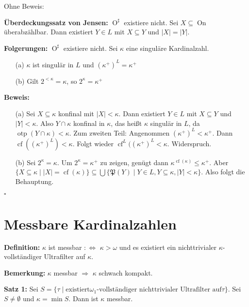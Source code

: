 \documentclass[a4paper,fontsize=11pt]{scrartcl}
\newcommand{\osharp}{\operatorname{O}^\sharp}
\newcommand{\On}{\operatorname{On}}
\newcommand{\cf}{\operatorname{cf}}
\newcommand{\otp}{\operatorname{otp}}
\begin{document}


Ohne Beweis:

{\bf Überdeckungssatz von Jensen:} $\osharp$ existiere
nicht. Sei $X\subseteq\On$ überabzählbar. Dann existiert $Y\in L$ mit
$X\subseteq Y$ und $|X|=|Y|$.

{\bf Folgerungen:} $\osharp$ existiere nicht. Sei $\kappa$ eine singuläre
Kardinalzahl.
\begin{itemize}
  \item[(a)] $\kappa$ ist singulär in $L$ und $(\kappa^+)^L=\kappa^+$
  \item[(b)] Gilt $2^{<\kappa}=\kappa$, so $2^\kappa=\kappa^+$
\end{itemize}
{\bf Beweis:}
\begin{itemize}
  \item[(a)] Sei $X\subseteq\kappa$ konfinal mit $|X|<\kappa$. Dann
    existiert $Y\in L$ mit $X\subseteq Y$ und $|Y|<\kappa$. Also
    $Y\cap\kappa$ konfinal in $\kappa$, das heißt $\kappa$ singulär in
    $L$, da $\otp(Y\cap\kappa)<\kappa$. Zum zweiten Teil: Angenommen
    $(\kappa^+)^L<\kappa^+$. Dann $\cf((\kappa^+)^L)<\kappa$. Folgt
    wieder $\cf^L((\kappa^+)^L<\kappa$. Widerspruch.
  \item[(b)] Sei $2^\kappa=\kappa$. Um $2^\kappa=\kappa^+$ zu zeigen,
    genügt dann $\kappa^{\cf(\kappa)}\le\kappa^+$. Aber
    $\{X\subseteq\kappa\mid |X|=\cf(\kappa)\}\subseteq
    \bigcup\{\mathfrak{P}(Y)\mid Y\in L, Y\subseteq\kappa,
    |Y|<\kappa\}$. Also folgt die Behauptung.
\end{itemize}
\hfill $\square$

\section{Messbare Kardinalzahlen}
{\bf Definition:} $\kappa$ ist messbar $:\Leftrightarrow$
$\kappa>\omega$ und es existiert ein nichttrivialer
$\kappa$-vollständiger Ultrafilter auf $\kappa$.

{\bf Bemerkung:} $\kappa$ messbar $\Rightarrow$ $\kappa$ schwach
kompakt.

{\bf Satz 1:} Sei $S=\{\tau\mid\mbox{existiert
}\omega_1\mbox{-vollständiger nichttrivialer Ultrafilter auf
}\tau\}$. Sei $S\neq\emptyset$ und $\kappa=\min S$. Dann ist $\kappa$
messbar.
\end{document}
